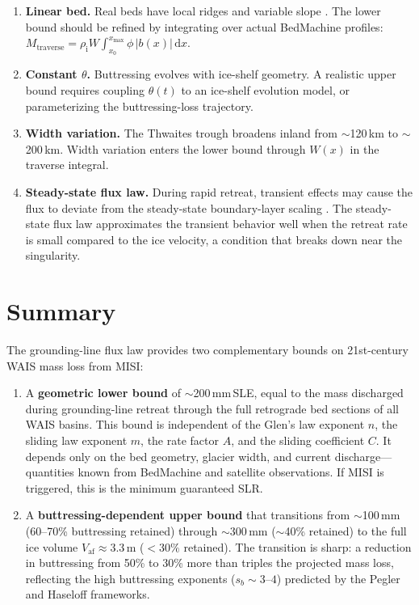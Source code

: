 \documentclass[11pt]{article}
\newcommand{\dd}{\mathrm{d}}
\newcommand{\rhoi}{\rho_{\mathrm{i}}}
\newcommand{\Vaf}{V_{\mathrm{af}}}
\begin{document}
\begin{enumerate}
	\item \textbf{Linear bed.} Real beds have local ridges and variable slope \citep{Morlighem2020}. The lower bound should be refined by integrating over actual BedMachine profiles: $M_{\mathrm{traverse}} = \rhoi W \int_{x_0}^{x_{\max}} \phi\, |b(x)|\,\dd x$.

	\item \textbf{Constant $\theta$.} Buttressing evolves with ice-shelf geometry. A realistic upper bound requires coupling $\theta(t)$ to an ice-shelf evolution model, or parameterizing the buttressing-loss trajectory.

	\item \textbf{Width variation.} The Thwaites trough broadens inland from $\sim$120\,km to $\sim$200\,km. Width variation enters the lower bound through $W(x)$ in the traverse integral.

	\item \textbf{Steady-state flux law.} During rapid retreat, transient effects may cause the flux to deviate from the steady-state boundary-layer scaling \citep{Schoof2012, HaseloffSergienko2022}. The steady-state flux law approximates the transient behavior well when the retreat rate is small compared to the ice velocity, a condition that breaks down near the singularity.
\end{enumerate}


\section*{Summary}

The grounding-line flux law provides two complementary bounds on 21st-century WAIS mass loss from MISI:

\begin{enumerate}
	\item A \textbf{geometric lower bound} of $\sim$200\,mm\,SLE, equal to the mass discharged during grounding-line retreat through the full retrograde bed sections of all WAIS basins. This bound is independent of the Glen's law exponent $n$, the sliding law exponent $m$, the rate factor $A$, and the sliding coefficient $C$. It depends only on the bed geometry, glacier width, and current discharge---quantities known from BedMachine and satellite observations. If MISI is triggered, this is the minimum guaranteed SLR.

	\item A \textbf{buttressing-dependent upper bound} that transitions from $\sim$100\,mm (60--70\% buttressing retained) through $\sim$300\,mm ($\sim$40\% retained) to the full ice volume $\Vaf \approx 3.3$\,m ($< 30\%$ retained). The transition is sharp: a reduction in buttressing from 50\% to 30\% more than triples the projected mass loss, reflecting the high buttressing exponents ($s_b \sim 3$--$4$) predicted by the Pegler and Haseloff frameworks.
\end{enumerate}
\end{document}
